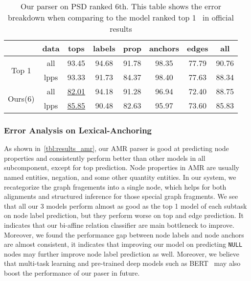 \begin{table}[!h]
\caption{\label{tbl:results_psd} Our parser on PSD ranked 6th. This table shows the error breakdown when comparing to the model ranked top 1~\cite{Don:Fow:Gro:19} in official results}
\small
\centering
\setlength{\tabcolsep}{2.5pt}
\begin{tabular}{cccccccc}
\toprule
                          & data & tops              & labels & prop  & anchors & edges & all   \\ \hline
\multirow{2}{*}{Top 1}   & all  & 93.45             & 94.68  & 91.78 & 98.35   & 77.79 & 90.76 \\
                          & lpps & 93.33             & 91.73  & 84.37 & 98.40   & 77.63 & 88.34 \\
\multirow{2}{*}{ Ours(6)} & all  & \underline{82.01} & 94.18  & 91.28 & 96.94   & 72.40 & 88.75 \\
                          & lpps & \underline{85.85} & 90.48  & 82.63 & 95.97   & 73.60 & 85.83 \\ \bottomrule
\end{tabular}
\end{table}

\subsubsection{Error Analysis on Lexical-Anchoring}
\label{sssec:lex-phr:error-lex}
As shown in~\autoref{tbl:results_amr}, our AMR parser is good at
predicting node properties and consistently perform better than other
models in all subcomponent, except for top prediction. Node properties
in AMR are usually named entities, negation, and some other quantity
entities. In our system, we recategorize the graph fragements into a
single node, which helps for both alignments and structured inference
for those special graph fragments. We see that all our 3 models
perform almost as good as the top 1 model of each subtask on node
label prediction, but they perform worse on top and edge
prediction. It indicates that our bi-affine relation classifier are
main bottleneck to improve. Moreover, we found the performance gap
between node labels and node anchors are almost consistent, it
indicates that improving our model on predicting \texttt{NULL} nodes may
further improve node label prediction as well.  Moreover, we believe
that multi-task learning and pre-trained deep models such as
BERT~\citep{devlin2018bert} may also boost the performance of our paser
in future.

